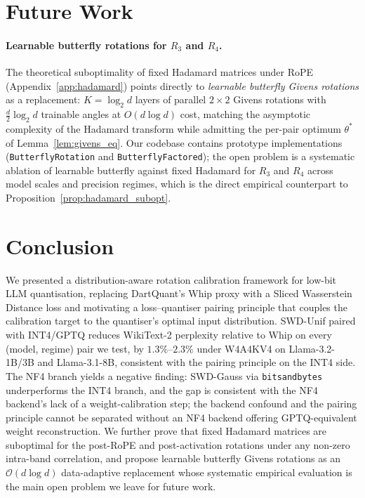 \documentclass[11pt,a4paper]{article}
\begin{document}
\section{Future Work}
\label{sec:future}

\paragraph{Learnable butterfly rotations for $R_3$ and $R_4$.}
The theoretical suboptimality of fixed Hadamard matrices under RoPE (Appendix~\ref{app:hadamard}) points directly to \emph{learnable butterfly Givens rotations} \cite{butterflyquant,dao2019,dao2020kaleidoscope} as a replacement: $K = \log_2 d$ layers of parallel $2 \times 2$ Givens rotations with $\frac{d}{2}\log_2 d$ trainable angles at $O(d \log d)$ cost, matching the asymptotic complexity of the Hadamard transform while admitting the per-pair optimum $\theta^*$ of Lemma~\ref{lem:givens_eq}. Our codebase contains prototype implementations (\texttt{ButterflyRotation} and \texttt{ButterflyFactored}); the open problem is a systematic ablation of learnable butterfly against fixed Hadamard for $R_3$ and $R_4$ across model scales and precision regimes, which is the direct empirical counterpart to Proposition~\ref{prop:hadamard_subopt}.


\section{Conclusion}
\label{sec:conclusion}

We presented a distribution-aware rotation calibration framework for low-bit LLM quantisation, replacing DartQuant's Whip proxy with a Sliced Wasserstein Distance loss and motivating a loss--quantiser pairing principle that couples the calibration target to the quantiser's optimal input distribution. SWD-Unif paired with INT4/GPTQ reduces WikiText-2 perplexity relative to Whip on every (model, regime) pair we test, by $1.3\%$--$2.3\%$ under W4A4KV4 on Llama-3.2-1B/3B and Llama-3.1-8B, consistent with the pairing principle on the INT4 side. The NF4 branch yields a negative finding: SWD-Gauss via \texttt{bitsandbytes} underperforms the INT4 branch, and the gap is consistent with the NF4 backend's lack of a weight-calibration step; the backend confound and the pairing principle cannot be separated without an NF4 backend offering GPTQ-equivalent weight reconstruction. We further prove that fixed Hadamard matrices are suboptimal for the post-RoPE and post-activation rotations under any non-zero intra-band correlation, and propose learnable butterfly Givens rotations as an $\mathcal{O}(d \log d)$ data-adaptive replacement whose systematic empirical evaluation is the main open problem we leave for future work.
\end{document}

